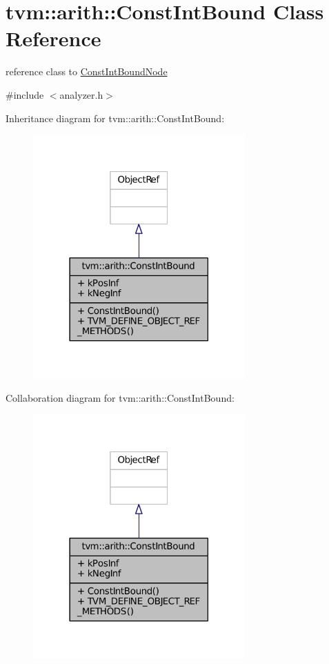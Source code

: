 \hypertarget{classtvm_1_1arith_1_1ConstIntBound}{}\section{tvm\+:\+:arith\+:\+:Const\+Int\+Bound Class Reference}
\label{classtvm_1_1arith_1_1ConstIntBound}


reference class to \hyperlink{classtvm_1_1arith_1_1ConstIntBoundNode}{Const\+Int\+Bound\+Node}  




{\ttfamily \#include $<$analyzer.\+h$>$}



Inheritance diagram for tvm\+:\+:arith\+:\+:Const\+Int\+Bound\+:
\nopagebreak
\begin{figure}[H]
\begin{center}
\leavevmode
\includegraphics[width=230pt]{classtvm_1_1arith_1_1ConstIntBound__inherit__graph}
\end{center}
\end{figure}


Collaboration diagram for tvm\+:\+:arith\+:\+:Const\+Int\+Bound\+:
\nopagebreak
\begin{figure}[H]
\begin{center}
\leavevmode
\includegraphics[width=230pt]{classtvm_1_1arith_1_1ConstIntBound__coll__graph}
\end{center}
\end{figure}

